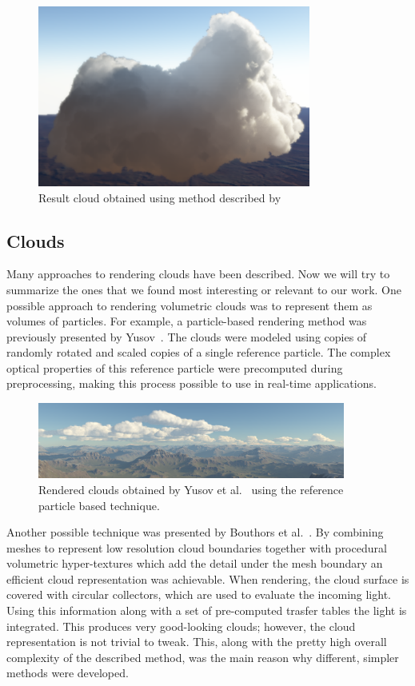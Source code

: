 \documentclass{ctuthesis}
\begin{document}
\begin{figure}
    \includegraphics[width=0.8\textwidth]{media/Bouthors_Cloud.png}
    \caption[Cloud by~\cite{bouthors2008interactive}]{Result cloud obtained using method described by~\cite{bouthors2008interactive}}
\end{figure}
\subsection{Clouds}

Many approaches to rendering clouds have been described. Now we will try to summarize the ones that
we found most interesting or relevant to our work. One possible approach to rendering volumetric
clouds was to represent them as volumes of particles. For example, a particle-based rendering method
was previously presented by Yusov~\cite{yusov2014clouds}. The clouds were modeled using copies of
randomly rotated and scaled copies of a single reference particle. The complex optical properties
of this reference particle were precomputed during preprocessing, making this process possible
to use in real-time applications.

\begin{figure}[h]
    \includegraphics[width=0.9\textwidth]{media/Yusov_clouds.png}
    \caption[Clouds by~\cite{yusov2014clouds}]{Rendered clouds obtained by Yusov et al.~\cite{yusov2014clouds}
        using the reference particle based technique.}
\end{figure}

Another possible technique was presented by Bouthors et al.~\cite{bouthors2008interactive}. By combining
meshes to represent low resolution cloud boundaries together with procedural volumetric hyper-textures
which add the detail under the mesh boundary an efficient cloud representation was achievable. When rendering,
the cloud surface is covered with circular collectors, which are used to evaluate the incoming light. Using
this information along with a set of pre-computed trasfer tables the light is integrated. This produces very
good-looking clouds; however, the cloud representation is not trivial to tweak. This, along with the pretty high
overall complexity of the described method, was the main reason why different, simpler methods were developed.
\end{document}
